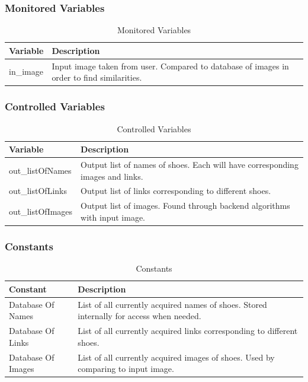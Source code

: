 \documentclass[12pt, titlepage]{article}
\begin{document}
\subsubsection{Monitored Variables}

\begin{table}[!htbp]
\begin{center}
\begin{tabular}{|p{5cm}|p{10cm}|}
	\hline
	\bf Variable & \bf Description \\
	\hline
	in\_image & Input image taken from user. Compared to database of images in order to find similarities. \\
	\hline
\end{tabular}
\caption{Monitored Variables}
\end{center}
\end{table}

\subsubsection{Controlled Variables}

\begin{table}[!htbp]
\begin{center}
\begin{tabular}{|p{5cm}|p{10cm}|}
	\hline
	\bf Variable & \bf Description \\
	\hline
    out\_listOfNames & Output list of names of shoes. Each will have corresponding images and links. \\
	\hline
	out\_listOfLinks & Output list of links corresponding to different shoes. \\
	\hline
    out\_listOfImages & Output list of images. Found through backend algorithms with input image. \\
	\hline
\end{tabular}
\caption{Controlled Variables}
\end{center}
\end{table}

\subsubsection{Constants}

\begin{table}[!htbp]
\begin{center}
\begin{tabular}{|p{5cm}|p{10cm}|}
	\hline
	\bf Constant & \bf Description \\
	\hline
	Database Of Names & List of all currently acquired names of shoes. Stored internally for access when needed. \\
	\hline
	Database Of Links & List of all currently acquired links corresponding to different shoes. \\
	\hline
	Database Of Images & List of all currently acquired images of shoes. Used by comparing to input image. \\
	\hline
\end{tabular}
\caption{Constants}
\end{center}
\end{table}
\end{document}
